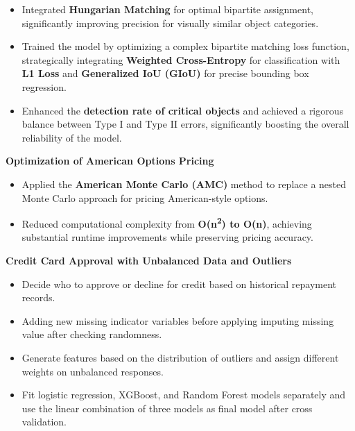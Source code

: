 \begin{cventries}
{\begin{cvitems}
\begin{itemize}
          \item {Integrated \textbf{Hungarian Matching} for optimal bipartite assignment, significantly improving precision for visually similar object categories.}
          \item {Trained the model by optimizing a complex bipartite matching loss function, strategically integrating \textbf{Weighted Cross-Entropy} for classification with \textbf{L1 Loss} and \textbf{Generalized IoU (GIoU)} for precise bounding box regression.}
          \item {Enhanced the \textbf{detection rate of critical objects} and achieved a rigorous balance between Type I and Type II errors, significantly boosting the overall reliability of the model.}
        \end{itemize}
      \vspace{0.5mm}
      \item \textbf{Optimization of American Options Pricing}
        \begin{itemize}
          \item Applied the \textbf{American Monte Carlo (AMC)} method to replace a nested Monte Carlo approach for pricing American-style options.
          \item Reduced computational complexity from \textbf{O(n\textsuperscript{2}) to O(n)}, achieving substantial runtime improvements while preserving pricing accuracy.
        \end{itemize}
      \vspace{0.5mm}
      \item \textbf{Credit Card Approval with Unbalanced Data and Outliers}
        \begin{itemize}
          \item Decide who to approve or decline for credit based on historical repayment records.
          \item Adding new missing indicator variables before applying imputing missing value after checking randomness. 
          \item Generate features based on the distribution of outliers and assign different weights on unbalanced responses.
          \item Fit logistic regression, XGBoost, and Random Forest models separately and use the linear combination of three models as final model after cross validation.
        \end{itemize}
    \end{cvitems}
  }



\end{cventries}
